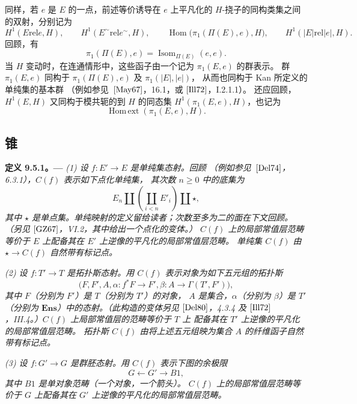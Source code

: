 同样，若 \(e\) 是 \(E\) 的一点，前述等价诱导在 \(e\) 上平凡化的
\(H\)-挠子的同构类集之间的双射，分别记为
\[
  H^1(E\mathbin{\mathrm{rel}}e,H),\qquad
  H^1(E^{\sim}\mathbin{\mathrm{rel}}e^{\sim},H),\qquad
  \operatorname{Hom}\bigl(\pi_1(\Pi(E),e),H\bigr),\qquad
  H^1(|E|\mathbin{\mathrm{rel}}|e|,H).
\]
回顾，有
\[
  \pi_1(\Pi(E),e)=\operatorname{Isom}_{\Pi(E)}(e,e).
\]
当 \(H\) 变动时，在连通情形中，这些函子由一个记为 \(\pi_1(E,e)\) 的群表示。
群 \(\pi_1(E,e)\) 同构于 \(\pi_1(\Pi(E),e)\) 及 \(\pi_1(|E|,|e|)\)，
从而也同构于 Kan 所定义的单纯集的基本群
（例如参见\ \([{\rm May67}]\)，16.1，或 \([{\rm Ill72}]\)，I.2.1.1）。
还应回顾，\(H^1(E,H)\) 又同构于模共轭的到 \(H\) 的同态集
\(H^1(\pi_1(E,e),H)\)，也记为
\[
  \operatorname{Hom\,ext}(\pi_1(E,e),H).
\]

\subsection{锥}

\par\medskip\noindent{}\textbf{定义 9.5.1。---}\enspace
\emph{(1) 设 \(f:E'\to E\) 是单纯集态射。回顾
（例如参见\ \([{\rm Del74}]\)，6.3.1），\(C(f)\) 表示如下点化单纯集，
其次数 \(n\geq0\) 中的底集为}
\[
  E_n\amalg\left(\coprod_{i<n}E'_i\right)\amalg\star,
\]
\emph{其中 \(\star\) 是单点集。单纯映射的定义留给读者；次数至多为二的面在下文回顾。
（另见 \([{\rm GZ67}]\)，VI.2，其中给出一个点化的变体。）
\(C(f)\) 上的局部常值层范畴等价于 \(E\) 上配备其在 \(E'\) 上逆像的平凡化的局部常值层范畴。
单纯集 \(C(f)\) 由 \(\star\to C(f)\) 自然带有标记点。}

\emph{(2) 设 \(f:T'\to T\) 是拓扑斯态射。用 \(C(f)\) 表示对象为如下五元组的拓扑斯}
\[
  \bigl(F,F',A,\alpha:f^*F\to F',
                 \beta:A\to\Gamma(T',F')\bigr),
\]
\emph{其中 \(F\)（分别为 \(F'\)）是 \(T\)（分别为 \(T'\)）的对象，
\(A\) 是集合，\(\alpha\)（分别为 \(\beta\)）是 \(T'\)（分别为
\(\mathbf{Ens}\)）中的态射。（此构造的变体另见 \([{\rm Del80}]\)，4.3.4 及
\([{\rm Ill72}]\)，III.4。）\(C(f)\) 上局部常值层的范畴等价于 \(T\) 上
配备其在 \(T'\) 上逆像的平凡化的局部常值层范畴。
拓扑斯 \(C(f)\) 由将上述五元组映为集合 \(A\) 的纤维函子自然带有标记点。}

\emph{(3) 设 \(f:G'\to G\) 是群胚态射。用 \(C(f)\) 表示下图的余极限}
\[
  G\longleftarrow G'\longrightarrow B1,
\]
\emph{其中 \(B1\) 是单对象范畴（一个对象，一个箭头）。
\(C(f)\) 上的局部常值层范畴等价于 \(G\) 上配备其在 \(G'\) 上逆像的平凡化的局部常值层范畴。}

